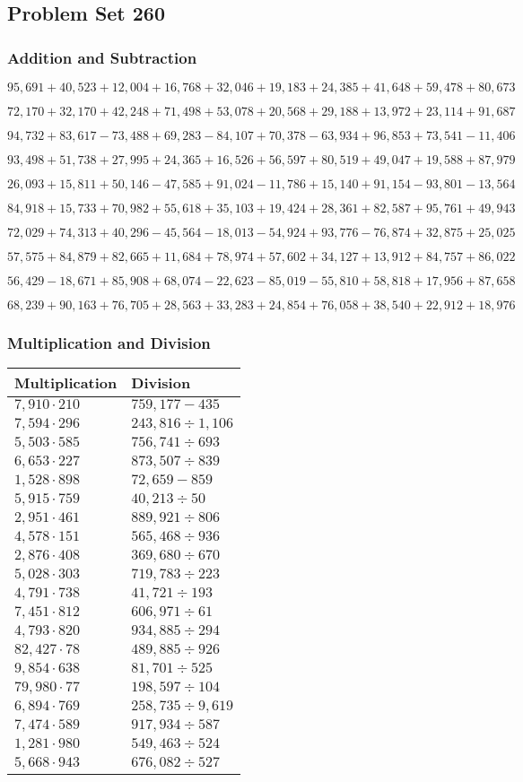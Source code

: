 \hypertarget{problem-set-260}{%
\subsection{Problem Set 260}\label{problem-set-260}}

\hypertarget{addition-and-subtraction}{%
\subsubsection{Addition and
Subtraction}\label{addition-and-subtraction}}

\(95,691+40,523+12,004+16,768+32,046+19,183+24,385+41,648+59,478+80,673\)

\(72,170+32,170+42,248+71,498+53,078+20,568+29,188+13,972+23,114+91,687\)

\(94,732+83,617-73,488+69,283-84,107+70,378-63,934+96,853+73,541-11,406\)

\(93,498+51,738+27,995+24,365+16,526+56,597+80,519+49,047+19,588+87,979\)

\(26,093+15,811+50,146-47,585+91,024-11,786+15,140+91,154-93,801-13,564\)

\(84,918+15,733+70,982+55,618+35,103+19,424+28,361+82,587+95,761+49,943\)

\(72,029+74,313+40,296-45,564-18,013-54,924+93,776-76,874+32,875+25,025\)

\(57,575+84,879+82,665+11,684+78,974+57,602+34,127+13,912+84,757+86,022\)

\(56,429-18,671+85,908+68,074-22,623-85,019-55,810+58,818+17,956+87,658\)

\(68,239+90,163+76,705+28,563+33,283+24,854+76,058+38,540+22,912+18,976\)

\hypertarget{multiplication-and-division}{%
\subsubsection{Multiplication and
Division}\label{multiplication-and-division}}

\begin{longtable}[]{@{}ll@{}}
\toprule
Multiplication & Division\tabularnewline
\midrule
\endhead
\(7,910\cdot210\) & \(759,177 - 435\)\tabularnewline
\(7,594\cdot296\) & \(243,816÷1,106\)\tabularnewline
\(5,503\cdot585\) & \(756,741÷693\)\tabularnewline
\(6,653\cdot227\) & \(873,507÷839\)\tabularnewline
\(1,528\cdot898\) & \(72,659 - 859\)\tabularnewline
\(5,915\cdot759\) & \(40,213÷50\)\tabularnewline
\(2,951\cdot461\) & \(889,921÷806\)\tabularnewline
\(4,578\cdot151\) & \(565,468÷936\)\tabularnewline
\(2,876\cdot408\) & \(369,680÷670\)\tabularnewline
\(5,028\cdot303\) & \(719,783÷223\)\tabularnewline
\(4,791\cdot738\) & \(41,721÷193\)\tabularnewline
\(7,451\cdot812\) & \(606,971÷61\)\tabularnewline
\(4,793\cdot820\) & \(934,885÷294\)\tabularnewline
\(82,427\cdot78\) & \(489,885÷926\)\tabularnewline
\(9,854\cdot638\) & \(81,701÷525\)\tabularnewline
\(79,980\cdot77\) & \(198,597÷104\)\tabularnewline
\(6,894\cdot769\) & \(258,735÷9,619\)\tabularnewline
\(7,474\cdot589\) & \(917,934÷587\)\tabularnewline
\(1,281\cdot980\) & \(549,463÷524\)\tabularnewline
\(5,668\cdot943\) & \(676,082÷527\)\tabularnewline
\bottomrule
\end{longtable}

